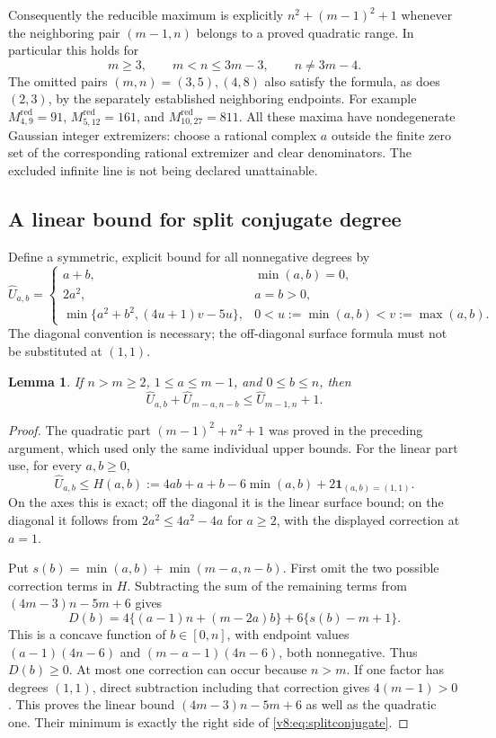 \documentclass[UTF8,11pt]{ctexart}
\newtheorem{lem}[thm]{Lemma}
\theoremstyle{definition}
\numberwithin{equation}{section}
\begin{document}
Consequently the reducible maximum is explicitly
$n^2+(m-1)^2+1$ whenever the neighboring pair $(m-1,n)$ belongs
to a proved quadratic range. In particular this holds for
\[
 m\ge3,\qquad m<n\le3m-3,\qquad n\ne3m-4.
\]
The omitted pairs $(m,n)=(3,5),(4,8)$ also satisfy the formula,
as does $(2,3)$, by the separately established neighboring endpoints.
For example $M^{\mathrm{red}}_{4,9}=91$,
$M^{\mathrm{red}}_{5,12}=161$, and
$M^{\mathrm{red}}_{10,27}=811$.
All these maxima have nondegenerate Gaussian integer extremizers:
choose a rational complex $a$ outside the finite zero set of the
corresponding rational extremizer and clear denominators.
The excluded infinite line is not being declared unattainable.

\subsection{A linear bound for split conjugate degree}

Define a symmetric, explicit bound for all nonnegative degrees by
\[
 \widehat U_{a,b}=
 \begin{cases}
 a+b,&\min(a,b)=0,\\
 2a^2,&a=b>0,\\
 \min\{a^2+b^2,(4u+1)v-5u\},&0<u:=\min(a,b)<v:=\max(a,b).
 \end{cases}
\]
The diagonal convention is necessary; the off-diagonal surface
formula must not be substituted at $(1,1)$.

\begin{lem}\label{v8:lem:splitconjugate}
If $n>m\ge2$, $1\le a\le m-1$, and $0\le b\le n$, then
\begin{equation}\label{v8:eq:splitconjugate}
 \widehat U_{a,b}+\widehat U_{m-a,n-b}
 \le \widehat U_{m-1,n}+1.
\end{equation}
\end{lem}
\begin{proof}
The quadratic part $(m-1)^2+n^2+1$ was proved in the preceding
argument, which used only the same individual upper bounds.
For the linear part use, for every $a,b\ge0$,
\[
 \widehat U_{a,b}\le
 H(a,b):=4ab+a+b-6\min(a,b)+2\mathbf1_{(a,b)=(1,1)}.
\]
On the axes this is exact; off the diagonal it is the linear
surface bound; on the diagonal it follows from
$2a^2\le4a^2-4a$ for $a\ge2$, with the displayed correction
at $a=1$.

Put $s(b)=\min(a,b)+\min(m-a,n-b)$. First omit the two possible
correction terms in $H$. Subtracting the sum of the remaining
terms from $(4m-3)n-5m+6$ gives
\[
 D(b)=4\{(a-1)n+(m-2a)b\}+6\{s(b)-m+1\}.
\]
This is a concave function of $b\in[0,n]$, with endpoint values
$(a-1)(4n-6)$ and $(m-a-1)(4n-6)$, both nonnegative.
Thus $D(b)\ge0$. At most one correction can occur because $n>m$.
If one factor has degrees $(1,1)$, direct subtraction including
that correction gives $4(m-1)>0$. This proves the linear bound
$(4m-3)n-5m+6$ as well as the quadratic one. Their minimum is
exactly the right side of \eqref{v8:eq:splitconjugate}.
\end{proof}
\end{document}
